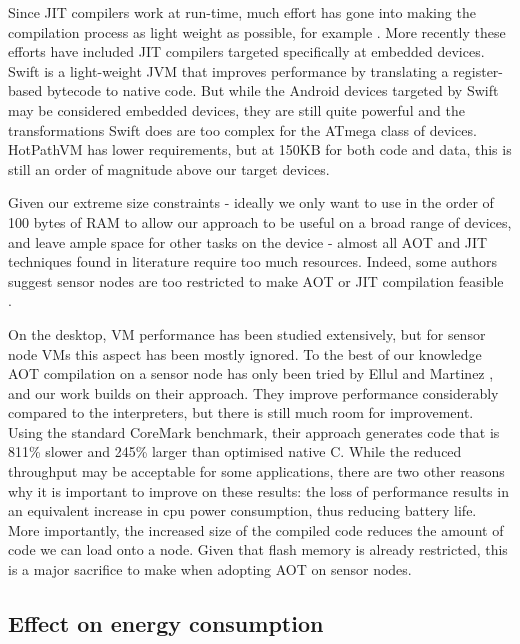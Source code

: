 Since JIT compilers work at run-time, much effort has gone into making the compilation process as light weight as possible, for example \cite{Krall:1998}. More recently these efforts have included JIT compilers targeted specifically at embedded devices. Swift \cite{Zhang:2012wf} is a light-weight JVM that improves performance by translating a register-based bytecode to native code. But while the Android devices targeted by Swift may be considered embedded devices, they are still quite powerful and the transformations Swift does are too complex for the ATmega class of devices. HotPathVM \cite{Gal:2006} has lower requirements, but at 150KB for both code and data, this is still an order of magnitude above our target devices.

Given our extreme size constraints - ideally we only want to use in the order of 100 bytes of RAM to allow our approach to be useful on a broad range of devices, and leave ample space for other tasks on the device - almost all AOT and JIT techniques found in literature require too much resources. Indeed, some authors suggest sensor nodes are too restricted to make AOT or JIT compilation feasible \cite{Aslam:2011thesis, Wirjawan:2008}.


On the desktop, VM performance has been studied extensively, but for sensor node VMs this aspect has been mostly ignored. To the best of our knowledge AOT compilation on a sensor node has only been tried by Ellul and Martinez \cite{Ellul:2010iw}, and our work builds on their approach. They improve performance considerably compared to the interpreters, but there is still much room for improvement. Using the standard CoreMark benchmark, their approach generates code that is 811\% slower and 245\% larger than optimised native C. While the reduced throughput may be acceptable for some applications, there are two other reasons why it is important to improve on these results: the loss of performance results in an equivalent increase in cpu power consumption, thus reducing battery life. More importantly, the increased size of the compiled code reduces the amount of code we can load onto a node. Given that flash memory is already restricted, this is a major sacrifice to make when adopting AOT on sensor nodes.

\subsection{Effect on energy consumption}

